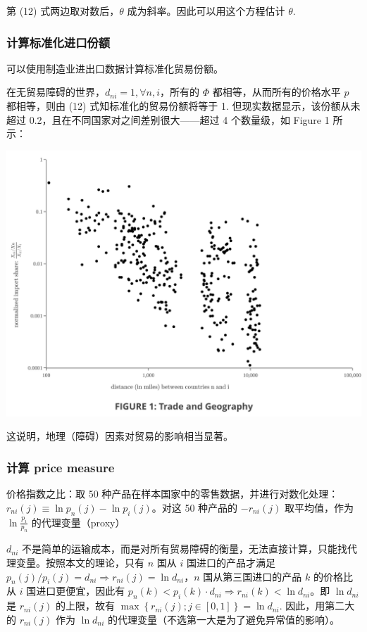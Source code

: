 \documentclass[
]{article}
\begin{document}
第 (12) 式两边取对数后，\(\theta\) 成为斜率。因此可以用这个方程估计 \(\theta\).

\hypertarget{ux8ba1ux7b97ux6807ux51c6ux5316ux8fdbux53e3ux4efdux989d}{%
\subsubsection{计算标准化进口份额}\label{ux8ba1ux7b97ux6807ux51c6ux5316ux8fdbux53e3ux4efdux989d}}

可以使用制造业进出口数据计算标准化贸易份额。

在无贸易障碍的世界，\(d_{ni}=1, \forall n, i\)，所有的 \(\Phi\)
都相等，从而所有的价格水平 \(p\) 都相等，则由 (12) 式知标准化的贸易份额将等于 1. 但现实数据显示，该份额从未超过
0.2，且在不同国家对之间差别很大------超过 4 个数量级，如 Figure 1 所示：

\begin{center}\includegraphics[width=0.9\linewidth]{img/Figure1} \end{center}

这说明，地理（障碍）因素对贸易的影响相当显著。

\hypertarget{ux8ba1ux7b97-price-measure}{%
\subsubsection{计算 price measure}\label{ux8ba1ux7b97-price-measure}}

价格指数之比：取 50 种产品在样本国家中的零售数据，并进行对数化处理：\(r_{n i}(j) \equiv \ln p_{n}(j)-\ln p_{i}(j)\)。对这 50 种产品的 \(-r_{n i}(j)\) 取平均值，作为 \(\ln \frac{p_i}{p_n}\) 的代理变量（proxy）

\(d_{ni}\) 不是简单的运输成本，而是对所有贸易障碍的衡量，无法直接计算，只能找代理变量。按照本文的理论，只有 \(n\) 国从 \(i\) 国进口的产品才满足 \(p_n(j)/p_i(j)=d_{ni} \Rightarrow r_{ni}(j)=\ln d_{ni}\)，\(n\) 国从第三国进口的产品 \(k\) 的价格比从 \(i\) 国进口更便宜，因此有 \(p_n(k)<p_i(k)\cdot d_{ni} \Rightarrow r_{ni}(k)<\ln d_{ni}\)。即 \(\ln d_{ni}\) 是 \(r_{ni}(j)\) 的上限，故有 \(\max\left\{ r_{ni}(j); j \in [0,1]\right\}=\ln d_{ni}\). 因此，用第二大的 \(r_{n i}(j)\) 作为 \(\ln d_{ni}\) 的代理变量（不选第一大是为了避免异常值的影响）。
\end{document}
